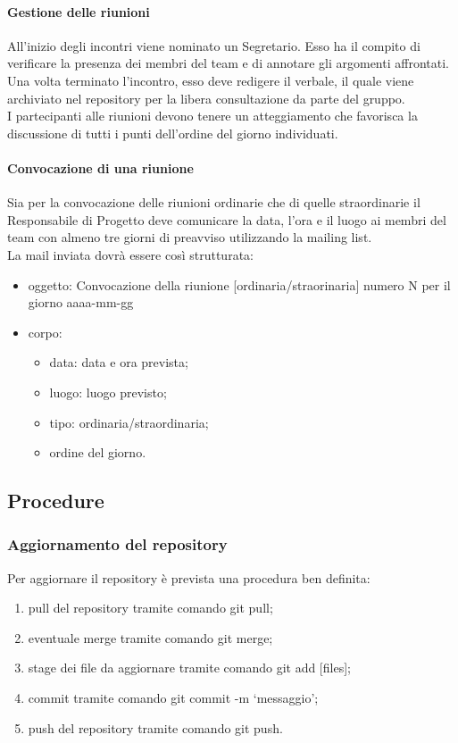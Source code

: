 			\paragraph{Gestione delle riunioni}
				All'inizio degli incontri viene nominato un Segretario. Esso ha il compito di verificare la presenza dei membri del team e di annotare gli argomenti affrontati. Una volta terminato l'incontro, esso deve redigere il verbale, il quale viene archiviato nel repository per la libera consultazione da parte del gruppo.\\
				I partecipanti alle riunioni devono tenere un atteggiamento che favorisca la discussione di tutti i punti dell'ordine del giorno individuati.
			\paragraph{Convocazione di una riunione}
				Sia per la convocazione delle riunioni ordinarie che di quelle straordinarie il Responsabile di Progetto deve comunicare la data, l'ora e il luogo ai membri del team con almeno tre giorni di preavviso utilizzando la mailing list.\\
				La mail inviata dovrà essere così strutturata:
				\begin{itemize}
					\item oggetto: Convocazione della riunione [ordinaria/straorinaria] numero N per il giorno aaaa-mm-gg
					\item corpo:
					\begin{itemize}
						\item data: data e ora prevista;
						\item luogo: luogo previsto;
						\item tipo:	ordinaria/straordinaria;
						\item ordine del giorno.
					\end{itemize}
				\end{itemize}
	\subsection{Procedure}
		\subsubsection{Aggiornamento del repository}
			Per aggiornare il repository è prevista una procedura ben definita:
			\begin{enumerate}
				\item pull del repository tramite comando git pull;
				\item eventuale merge tramite comando git merge;
				\item stage dei file da aggiornare tramite comando git add [files];
				\item commit tramite comando git commit -m ‘messaggio’;
				\item push del repository tramite comando git push.
			\end{enumerate}
